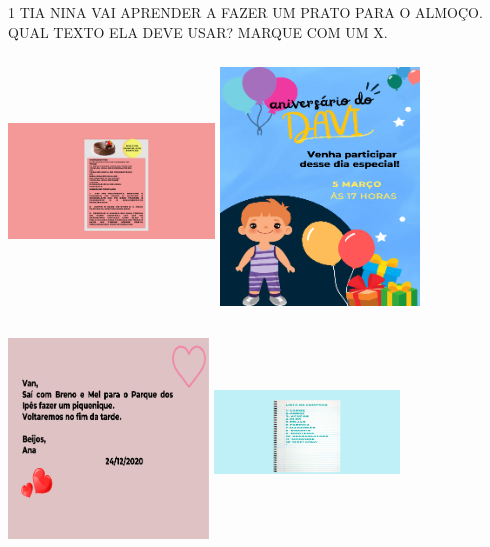 
\num{1} TIA NINA VAI APRENDER A FAZER UM PRATO PARA O ALMOÇO. QUAL TEXTO ELA DEVE USAR? MARQUE COM UM X.

\includegraphics[width=2.15625in,height=2.60417in]{media/image137.png}
\includegraphics[width=2.08333in,height=2.49514in]{media/image138.png}

\includegraphics[width=2.09375in,height=2.10278in]{media/image139.png}
\includegraphics[width=1.94236in,height=2.23611in]{media/image140.png}

